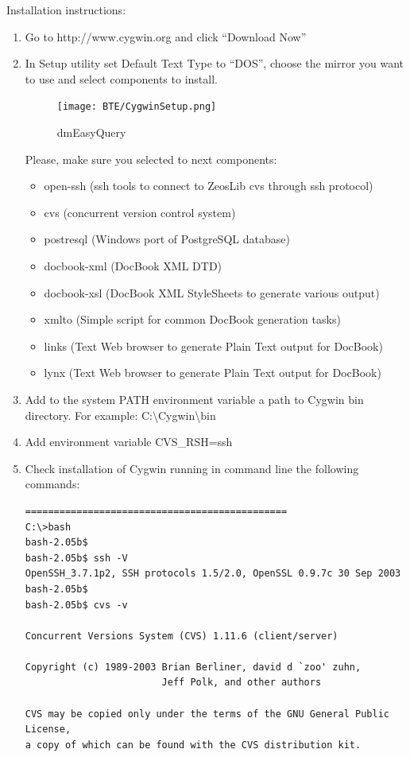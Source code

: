 \documentclass[a4paper,12pt,oneside]{book}
\begin{document}
Installation instructions:
\begin{enumerate}
  \item Go to http://www.cygwin.org and click “Download Now”
	\item In Setup utility set Default Text Type to “DOS”, choose the mirror you want to use and select components to install.
    \begin{figure}[htbp] 
      \centering
      \texttt{[image: BTE/CygwinSetup.png]}
      \caption{dmEasyQuery}
      \label{fig:CygwinSetup}
    \end{figure}
		Please, make sure you selected to next components:
		\begin{itemize}
		  \item open-ssh (ssh tools to connect to ZeosLib cvs through ssh protocol)
			\item cvs (concurrent version control system)
			\item postresql (Windows port of PostgreSQL database)
			\item docbook-xml (DocBook XML DTD)
			\item docbook-xsl (DocBook XML StyleSheets to generate various output)
			\item xmlto (Simple script for common DocBook generation tasks)
			\item links (Text Web browser to generate Plain Text output for DocBook)
			\item lynx (Text Web browser to generate Plain Text output for DocBook)
		\end{itemize}
	\item 
	  Add to the system PATH environment variable a path to Cygwin bin directory.
		For example: C:\textbackslash Cygwin\textbackslash bin
	\item Add environment variable CVS\_RSH=ssh
	\item Check installation of Cygwin running in command line the following commands:
	  \begin{verbatim}
==============================================
C:\>bash
bash-2.05b$
bash-2.05b$ ssh -V
OpenSSH_3.7.1p2, SSH protocols 1.5/2.0, OpenSSL 0.9.7c 30 Sep 2003
bash-2.05b$
bash-2.05b$ cvs -v

Concurrent Versions System (CVS) 1.11.6 (client/server)

Copyright (c) 1989-2003 Brian Berliner, david d `zoo' zuhn,
                        Jeff Polk, and other authors

CVS may be copied only under the terms of the GNU General Public License,
a copy of which can be found with the CVS distribution kit.


\end{verbatim}
\end{enumerate}
\end{document}
